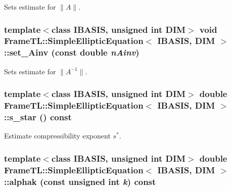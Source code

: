 Sets estimate for $\|A\|$. \hypertarget{classFrameTL_1_1SimpleEllipticEquation_dace879d1d00d7e327a108c68451c714}{
\subsubsection[set\_\-Ainv]{\setlength{\rightskip}{0pt plus 5cm}template$<$class IBASIS, unsigned int DIM$>$ void {\bf FrameTL::SimpleEllipticEquation}$<$ IBASIS, DIM $>$::set\_\-Ainv (const double {\em nAinv})}}
\label{classFrameTL_1_1SimpleEllipticEquation_dace879d1d00d7e327a108c68451c714}


Sets estimate for $\|A^{-1}\|$. \hypertarget{classFrameTL_1_1SimpleEllipticEquation_26ed425b0ab5dc516bd626730d08c4af}{
\subsubsection[s\_\-star]{\setlength{\rightskip}{0pt plus 5cm}template$<$class IBASIS, unsigned int DIM$>$ double {\bf FrameTL::SimpleEllipticEquation}$<$ IBASIS, DIM $>$::s\_\-star () const}}
\label{classFrameTL_1_1SimpleEllipticEquation_26ed425b0ab5dc516bd626730d08c4af}


Estimate compressibility exponent $s^\ast$. \hypertarget{classFrameTL_1_1SimpleEllipticEquation_aa99066841e723261103f2e7354eff92}{
\subsubsection[alphak]{\setlength{\rightskip}{0pt plus 5cm}template$<$class IBASIS, unsigned int DIM$>$ double {\bf FrameTL::SimpleEllipticEquation}$<$ IBASIS, DIM $>$::alphak (const unsigned int {\em k}) const}}
\label{classFrameTL_1_1SimpleEllipticEquation_aa99066841e723261103f2e7354eff92}


